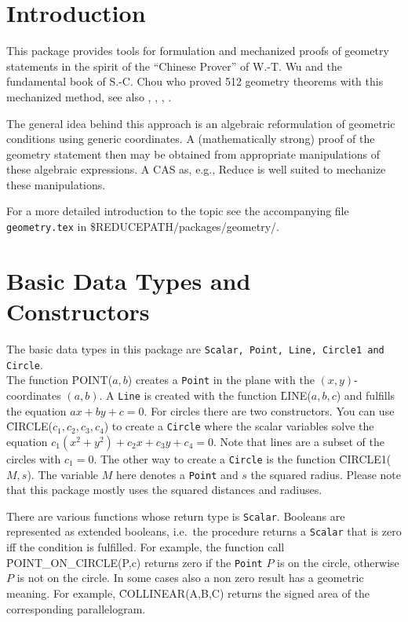 \documentclass[11pt,letterpaper]{book}
\begin{document}
\section{Introduction}

This package provides tools for formulation and mechanized proofs of
geometry statements in the spirit of the ``Chinese Prover'' of
W.-T. Wu \cite{Wu:94} and the fundamental book \cite{Chou:88} of
S.-C. Chou who proved 512 geometry theorems with this mechanized
method, see also \cite{Chou:84}, \cite{Chou:90}, \cite{Wu:84a},
\cite{Wu:84b}.

The general idea behind this approach is an algebraic reformulation of
geometric conditions using generic coordinates. A (mathematically
strong) proof of the geometry statement then may be obtained from
appropriate manipulations of these algebraic expressions.  A CAS as,
e.g., Reduce is well suited to mechanize these manipulations.

For a more detailed introduction to the topic see the accompanying
file {\tt geometry.tex} in \$REDUCEPATH/packages/geometry/.


\section{Basic Data Types and Constructors}

The basic data types in this package are {\tt Scalar, Point, Line, Circle1
and Circle}. \\
The function \f{POINT($a,b$)} creates a {\tt Point} in the plane with
the $(x,y)$-coordinates $(a,b)$.
A {\tt Line} is created with the function \f{LINE($a,b,c$)} and
fulfills the equation $ ax + by + c = 0$.
For circles there are two constructors. You can use
\f{CIRCLE($c_1,c_2,c_3,c_4$)} to create a {\tt Circle} where
the scalar variables solve the equation $c_1(x^2+y^2) + c_2x + c_3y + c_4 = 0$.
Note that lines are a subset of the circles with $c_1=0$. The other way
to create a {\tt Circle} is the function \f{CIRCLE1($M,s$)}.
The variable $M$ here denotes a {\tt Point} and $s$ the squared
radius. Please note that this package mostly uses the squared distances and
radiuses.


There are various functions whose return type is {\tt Scalar}.
Booleans are represented as extended booleans, i.e.\ the
procedure returns a {\tt Scalar} that is zero iff the condition is fulfilled.
For example, the function call \f{POINT\_ON\_CIRCLE(P,c)} returns zero if
the {\tt Point} $P$ is on the circle, otherwise $P$ is not on the circle.
In some cases also a non zero result has a geometric meaning. For example,
\f{COLLINEAR(A,B,C)} returns the signed area of the corresponding
parallelogram.
\end{document}
